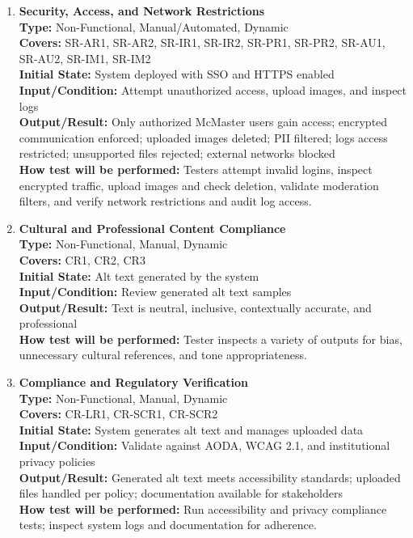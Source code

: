 \documentclass[12pt, titlepage]{article}
\begin{document}
\begin{enumerate}[label=NFR-ST \arabic*., wide=0pt, leftmargin=*]
  \item \textbf{Security, Access, and Network Restrictions} \\[2mm]
    \textbf{Type:} Non-Functional, Manual/Automated, Dynamic \\
    \textbf{Covers:} SR-AR1, SR-AR2, SR-IR1, SR-IR2, SR-PR1, SR-PR2,
    SR-AU1, SR-AU2, SR-IM1, SR-IM2 \\
    \textbf{Initial State:} System deployed with SSO and HTTPS enabled \\
    \textbf{Input/Condition:} Attempt unauthorized access, upload
    images, and inspect logs \\
    \textbf{Output/Result:} Only authorized McMaster users gain
    access; encrypted communication enforced; uploaded images
    deleted; PII filtered; logs access restricted; unsupported files
    rejected; external networks blocked \\[2mm]
    \textbf{How test will be performed:} Testers attempt invalid
    logins, inspect encrypted traffic, upload images and check
    deletion, validate moderation filters, and verify network
    restrictions and audit log access.

  \item \textbf{Cultural and Professional Content Compliance} \\[2mm]
    \textbf{Type:} Non-Functional, Manual, Dynamic \\
    \textbf{Covers:} CR1, CR2, CR3 \\
    \textbf{Initial State:} Alt text generated by the system \\
    \textbf{Input/Condition:} Review generated alt text samples \\
    \textbf{Output/Result:} Text is neutral, inclusive, contextually
    accurate, and professional \\[2mm]
    \textbf{How test will be performed:} Tester inspects a variety of
    outputs for bias, unnecessary cultural references, and tone appropriateness.

  \item \textbf{Compliance and Regulatory Verification} \\[2mm]
    \textbf{Type:} Non-Functional, Manual, Dynamic \\
    \textbf{Covers:} CR-LR1, CR-SCR1, CR-SCR2 \\
    \textbf{Initial State:} System generates alt text and manages
    uploaded data \\
    \textbf{Input/Condition:} Validate against AODA, WCAG 2.1, and
    institutional privacy policies \\
    \textbf{Output/Result:} Generated alt text meets accessibility
    standards; uploaded files handled per policy; documentation
    available for stakeholders \\[2mm]
    \textbf{How test will be performed:} Run accessibility and
    privacy compliance tests; inspect system logs and documentation
    for adherence.


\end{enumerate}
\end{document}
